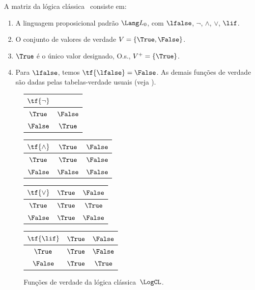 \documentclass[../../../include/open-logic-section]{subfiles}
\begin{document}
\begin{ex}
A matriz da lógica clássica~\LogCL{} consiste em:
\begin{enumerate}
  \item A linguagem proposicional padrão $\Lang L_0$, com
  $\lfalse$, $\lnot$, $\land$, $\lor$, $\lif$.
  \item O conjunto de valores de verdade $V = \{\True, \False\}$.
  \item $\True$ é o único valor designado, O.s.\@, $V^+ = \{\True\}$.
  \item Para $\lfalse$, temos $\tf{\lfalse} = \False$. As demais
  funções de verdade são dadas pelas tabelas-verdade usuais (veja
  ).
\end{enumerate}
\begin{figure}
  \begin{center}
      \begin{tabular}{c|c} 
        $\tf{\lnot}$ & \\ 
        \hline  
        $\True$ & $\False$ \\ 
        $\False$ & $\True$ 
      \end{tabular}
      \quad
      \begin{tabular}{c|cc} 
        $\tf{\land}$ & $\True$ & $\False$ \\ 
        \hline 
        $\True$ & $\True$ & $\False$ \\ 
        $\False$ & $\False$ & $\False$ 
      \end{tabular}
      \quad
      \begin{tabular}{c|cc} 
        $\tf{\lor}$ & $\True$ & $\False$ \\ 
        \hline 
        $\True$ & $\True$ & $\True$ \\ 
        $\False$ & $\True$ & $\False$ 
      \end{tabular}
      \quad
      \begin{tabular}{c|cc} 
        $\tf{\lif}$ & $\True$ & $\False$ \\ 
        \hline 
        $\True$ & $\True$ & $\False$ \\ 
        $\False$ & $\True$ & $\True$ 
      \end{tabular}
    \end{center} 
    \caption{Funções de verdade da lógica clássica~$\LogCL$.}
  \end{figure}
  \end{ex}
\end{document}
